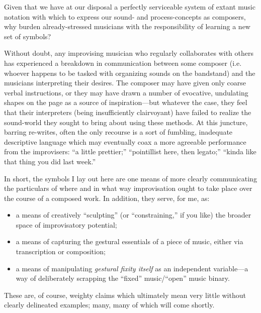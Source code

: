 \documentclass[twoside, 11pt]{book}
\begin{document}
    Given that we have at our disposal a perfectly serviceable system of extant music notation with which to express our sound- and process-concepts as composers, why burden already-stressed musicians with the responsibility of learning a new set of symbols?
   
    Without doubt, any improvising musician who regularly collaborates with others has experienced a breakdown in communication between some composer (i.e. whoever happens to be tasked with organizing sounds on the bandstand) and the musicians interpreting their desires. The composer may have given only coarse verbal instructions, or they may have drawn a number of evocative, undulating shapes on the page as a source of inspiration---but whatever the case, they feel that their interpreters (being insufficiently clairvoyant) have failed to realize the sound-world they sought to bring about using these methods. At this juncture, barring re-writes, often the only recourse is a sort of fumbling, inadequate descriptive language which may eventually coax a more agreeable performance from the improvisers: ``a little prettier;'' ``pointillist here, then legato;'' ``kinda like that thing you did last week.''

    In short, the symbols I lay out here are one means of more clearly communicating the particulars of where and in what way improvisation ought to take place over the course of a composed work. In addition, they serve, for me, as:
        \begin{itemize}
            \item a means of creatively ``sculpting'' (or ``constraining,'' if you like) the broader space of improvisatory potential;
            \item a means of capturing the gestural essentials of a piece of music, either via transcription or composition;
            \item a means of manipulating \textit{gestural fixity itself} as an independent variable---a way of deliberately scrapping the ``fixed'' music/``open'' music binary.
        \end{itemize}

    These are, of course, weighty claims which ultimately mean very little without clearly delineated examples; many, many of which will come shortly.
    
\end{document}
